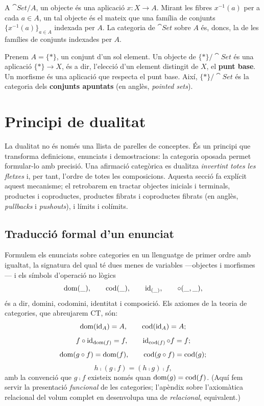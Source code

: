 \begin{exemple}
A $\cat{Set}/A$, un objecte és una aplicació $x\colon X\to A$. Mirant les fibres $x^{-1}(a)$ per a cada $a\in A$, un tal objecte és el mateix que una família de conjunts $\{x^{-1}(a)\}_{a\in A}$ indexada per $A$. La categoria de $\cat{Set}$ sobre $A$ és, doncs, la de les famílies de conjunts indexades per $A$.
\end{exemple}

\begin{exemple}
Prenem $A=\{\ast\}$, un conjunt d'un sol element. Un objecte de $\{\ast\}/\cat{Set}$ és una aplicació $\{\ast\}\to X$, és a dir, l'elecció d'un element distingit de $X$, el \textbf{punt base}. Un morfisme és una aplicació que respecta el punt base. Així, $\{\ast\}/\cat{Set}$ és la categoria dels \textbf{conjunts apuntats} (en anglès, \emph{pointed sets}).
\end{exemple}

\section{Principi de dualitat}\label{sec:dualitat}

La dualitat no és només una llista de parelles de conceptes. És un principi que transforma definicions, enunciats i demostracions: la categoria oposada permet formular-lo amb precisió. Una afirmació categòrica es dualitza \emph{invertint totes les fletxes} i, per tant, l'ordre de totes les composicions. Aquesta secció fa explícit aquest mecanisme; el retrobarem en tractar objectes inicials i terminals, productes i coproductes, productes fibrats i coproductes fibrats (en anglès, \emph{pullbacks} i \emph{pushouts}), i límits i colímits.

\subsection{Traducció formal d'un enunciat}

Formulem els enunciats sobre categories en un llenguatge de primer ordre amb igualtat, la signatura del qual té dues menes de variables ---objectes i morfismes--- i els símbols d'operació no lògics
\[
\operatorname{dom}(\_),\qquad \operatorname{cod}(\_),\qquad \operatorname{id}_{(\_)},\qquad \circ(\_,\_),
\]
és a dir, domini, codomini, identitat i composició. Els axiomes de la teoria de categories, que abreujarem $\mathrm{CT}$, són:
\[
\operatorname{dom}(\operatorname{id}_A)=A,\qquad \operatorname{cod}(\operatorname{id}_A)=A;
\]
\[
f\circ\operatorname{id}_{\operatorname{dom}(f)}=f,\qquad \operatorname{id}_{\operatorname{cod}(f)}\circ f=f;
\]
\[
\operatorname{dom}(g\circ f)=\operatorname{dom}(f),\qquad \operatorname{cod}(g\circ f)=\operatorname{cod}(g);
\]
\[
h\comp(g\comp f)=(h\comp g)\comp f,
\]
amb la convenció que $g\comp f$ existeix només quan $\operatorname{dom}(g)=\operatorname{cod}(f)$. (Aquí fem servir la presentació \emph{funcional} de les categories; l'apèndix sobre l’axiomàtica relacional del volum complet en desenvolupa una de \emph{relacional}, equivalent.)

